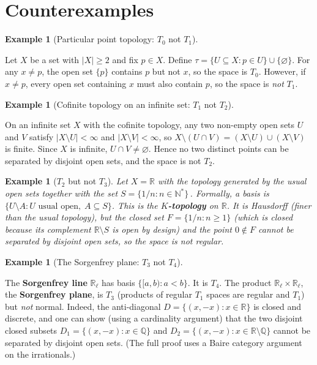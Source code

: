 \documentclass[11pt,a4paper,twoside]{book}
\theoremstyle{remark}
\theoremstyle{definition}
\newtheorem{exampleplain}[theorem]{Example}
\theoremstyle{definition}
\newenvironment{example}[1][]{%
  \begin{exampleplain}[#1]\itshape
}{%
  \end{exampleplain}
}
\begin{document}
\section{Counterexamples}
\label{sec:separation-counterexamples}

\begin{example}[Particular point topology: $T_0$ not $T_1$]
\label{ex:particular-point}
Let $X$ be a set with $|X| \ge 2$ and fix $p \in X$.  Define
$\tau = \{U \subseteq X : p \in U\} \cup \{\varnothing\}$.  For any
$x \neq p$, the open set $\{p\}$ contains $p$ but not $x$, so the space is
$T_0$.  However, if $x \neq p$, every open set containing $x$ must also
contain $p$, so the space is \emph{not} $T_1$.
\end{example}

\begin{example}[Cofinite topology on an infinite set: $T_1$ not $T_2$]
\label{ex:cofinite-not-T2}
On an infinite set $X$ with the cofinite topology, any two non-empty open sets
$U$ and $V$ satisfy $|X \setminus U| < \infty$ and $|X \setminus V| < \infty$,
so $X \setminus (U \cap V) = (X \setminus U) \cup (X \setminus V)$ is finite.
Since $X$ is infinite, $U \cap V \neq \varnothing$.  Hence no two distinct
points can be separated by disjoint open sets, and the space is not $T_2$.
\end{example}

\begin{example}[$T_2$ but not $T_3$]\label{ex:T2-not-T3}
Let $X = \mathbb{R}$ with the topology generated by the usual open sets
together with the set $S = \{1/n : n \in \mathbb{N}^*\}$\,.  Formally, a basis
is $\{U \setminus A : U \text{ usual open},\; A \subseteq S\}$.  This is the
\textbf{$K$-topology} on $\mathbb{R}$.  It is
Hausdorff (finer than the usual topology), but the closed set
$F = \{1/n : n \ge 1\}$ (which is closed because its complement
$\mathbb{R} \setminus S$ is open by design) and the point $0 \notin F$ cannot
be separated by disjoint open sets, so the space is not regular.
\end{example}

\begin{example}[The Sorgenfrey plane: $T_3$ not $T_4$]
\label{ex:sorgenfrey-plane}
The \textbf{Sorgenfrey line} $\mathbb{R}_\ell$ has basis
$\{[a,b) : a < b\}$.  It is $T_4$.  The product
$\mathbb{R}_\ell \times \mathbb{R}_\ell$, the \textbf{Sorgenfrey plane}, is
$T_3$ (products of regular $T_1$ spaces are regular and $T_1$) but \emph{not}
normal.  Indeed, the anti-diagonal
$D = \{(x,-x) : x \in \mathbb{R}\}$ is closed and discrete, and one can show
(using a cardinality argument) that the two disjoint closed subsets
$D_1 = \{(x,-x) : x \in \mathbb{Q}\}$ and
$D_2 = \{(x,-x) : x \in \mathbb{R} \setminus \mathbb{Q}\}$
cannot be separated by disjoint open sets.  (The full proof uses a Baire
category argument on the irrationals.)
\end{example}
\end{document}
